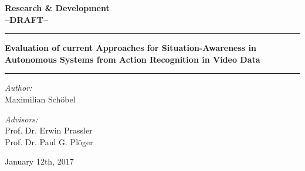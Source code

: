 \documentclass{scrartcl}
\begin{document}
\begin{center}
\LARGE
\textbf{Research \& Development} \\
\textbf{--DRAFT--}

\vspace{2cm}

\rule{\linewidth}{2pt}
\textbf{Evaluation of current Approaches for Situation-Awareness in Autonomous Systems from Action Recognition in Video Data} \\
\rule{\linewidth}{2pt}
\bigskip

\normalsize
\textit{Author:}\\
Maximilian Schöbel
\bigskip

\textit{Advisors:}\\
Prof. Dr. Erwin Prassler\\
Prof. Dr. Paul G. Plöger

\vspace{4cm}
January 12th, 2017
\end{center}

\newpage

\tableofcontents

\newpage







\newpage

\printbibliography
\end{document}
